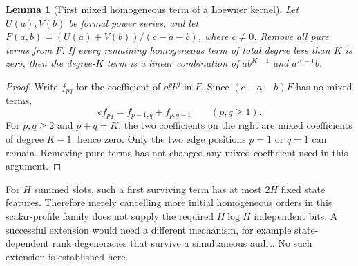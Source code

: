 \documentclass[11pt]{article}
\newtheorem{lemma}{Lemma}
\begin{document}
\begin{lemma}[First mixed homogeneous term of a Loewner kernel]
Let $U(a),V(b)$ be formal power series, and let
$F(a,b)=(U(a)+V(b))/(c-a-b)$, where $c\ne0$. Remove all pure
terms from $F$. If every remaining homogeneous term of total degree
less than $K$ is zero, then the degree-$K$ term is a linear
combination of $ab^{K-1}$ and $a^{K-1}b$.
\end{lemma}
\begin{proof}
Write $f_{pq}$ for the coefficient of $a^pb^q$ in $F$.
Since $(c-a-b)F$ has no mixed terms,
\[
          c f_{pq}=f_{p-1,q}+f_{p,q-1}\qquad(p,q\ge1).
\]
For $p,q\ge2$ and $p+q=K$, the two coefficients on the right are
mixed coefficients of degree $K-1$, hence zero. Only the two edge
positions $p=1$ or $q=1$ can remain. Removing pure terms has not
changed any mixed coefficient used in this argument.
\end{proof}

For $H$ summed slots, such a first surviving term has at most $2H$
fixed state features. Therefore merely cancelling more initial
homogeneous orders in this scalar-profile family does not supply
the required $H\log H$ independent bits. A successful extension
would need a different mechanism, for example state-dependent rank
degeneracies that survive a simultaneous audit. No such extension
is established here.
\end{document}
